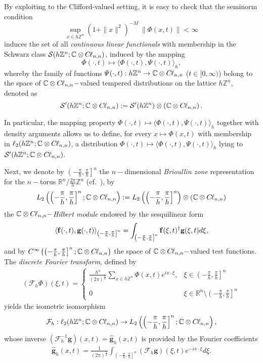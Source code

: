 \documentclass{elsarticle}
\newcommand{\BR}{{\mathbb R}}
\newcommand{\BC}{{\mathbb C}}
\newcommand{\BZ}{{\mathbb Z}}
\newcommand{\Qh}{\left(-\frac{\pi}{h},\frac{\pi}{h}\right]^n}
\newcommand{\g}{\textbf{g}}
\newcommand{\cl}{C \kern -0.1em \ell}
\begin{document}
By exploiting \cite[Exercise 3.1.7]{RuzhanskyT10} to the Clifford-valued setting, it is easy to check that the seminorm condition
$$ \displaystyle \sup_{x \in h\BZ^n} (1+\| x\|^2)^{-M}~\| \varPhi(x,t)\|<\infty$$
induces the set of all \textit{continuous linear functionals} with membership in the Schwarz class $\mathcal{S}(h\BZ^n;\BC\otimes \cl_{n,n})$, induced by the mapping $$\varPhi(\cdot,t) \mapsto \langle \varPhi(\cdot,t),\varPsi(\cdot,t)\rangle_{h},$$ whereby the family of functions $\varPsi(\cdot,t):h\BZ^n \rightarrow \BC\otimes \cl_{n,n}$ ($t\in [0,\infty)$) belong to the space of $\BC\otimes \cl_{n,n}-$valued tempered distributions on the lattice $h\BZ^n$, denoted as $$\mathcal{S}'(h\BZ^n;\BC\otimes \cl_{n,n}):=\mathcal{S}'(h\BZ^n)\otimes\left(\BC\otimes \cl_{n,n}\right).$$  

In particular, the mapping property $\varPhi(\cdot,t) \mapsto \langle \varPhi(\cdot,t),\varPsi(\cdot,t)\rangle_{h}$ together with density arguments allows us to define, for every $x\mapsto \varPhi(x,t)$ with membership in
$
\ell_2(h\BZ^n;\BC\otimes \cl_{n,n})
$, a distribution $\varPhi(\cdot,t) \mapsto \langle \varPhi(\cdot,t),\varPsi(\cdot,t)\rangle_{h}$ lying to $\mathcal{S}'(h\BZ^n;\BC\otimes \cl_{n,n})$.

Next, we denote by $\Qh$ the
$n-$dimensional \textit{Brioullin zone} representation for the $n-$torus $\BR^n/\frac{2\pi}{h}\BZ^n$ (cf.~\cite[p.~
324]{Rabin82}), by $$L_2\left(\Qh;\BC\otimes\cl_{n,n}\right):=L_2\left(\Qh\right)\otimes\left(\BC\otimes \cl_{n,n}\right)$$ the $\BC \otimes \cl_{n,n}-$\textit{Hilbert module} endowed by the sesquilinear form
\begin{eqnarray}
	\label{BilinearFormQh}	\displaystyle \langle {\bf f}(\cdot,t),\g(\cdot,t
	)\rangle_{\Qh}= \int_{\Qh} {\bf f}(\xi,t)^\dag \g(\xi,t) d\xi,
\end{eqnarray}
and by $C^\infty\left(\Qh;\BC \otimes \cl_{n,n}\right)$ the space of $\BC \otimes \cl_{n,n}-$valued test functions.
The \textit{discrete Fourier transform}, defined by
\begin{eqnarray}
	\label{discreteFh}
	(\mathcal{F}_{h} \varPhi)(\xi,t)=\left\{\begin{array}{lll}
		\displaystyle \frac{h^n}{\left(2\pi\right)^{\frac{n}{2}}}\displaystyle 
		\sum_{x\in h\BZ^n}\varPhi(x,t)e^{i x \cdot \xi}, & \xi\in \Qh
		\\ \ \\
		0  & \xi\in \BR^n \setminus \Qh
	\end{array}\right.
\end{eqnarray}
yields the isometric isomorphism $$\mathcal{F}_{h}:\ell_2(h\BZ^n;\BC \otimes \cl_{n,n})\rightarrow L_2\left(\Qh;\BC \otimes \cl_{n,n}\right),$$ whose inverse $(\mathcal{F}_{h}^{-1} \g)(x,t)=\widehat{\g}_{h}(x,t)
$ is provided by the Fourier coefficients 
\begin{eqnarray}
	\label{FourierInversion}
	\widehat{\g}_{h}(x,t)=\frac{1}{(2\pi)^{\frac{n}{2}}}\int_{\Qh} (\mathcal{F}_{h} \g)(\xi,t) e^{-i x \cdot \xi} d\xi.
\end{eqnarray} 
\end{document}
